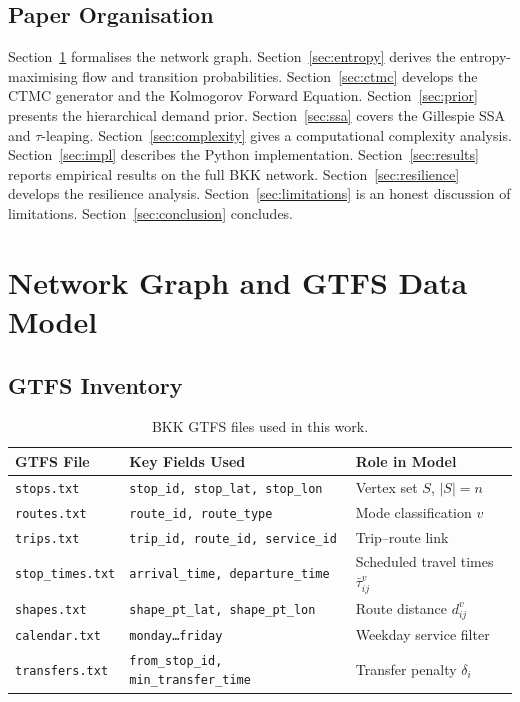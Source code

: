 \documentclass[11pt,a4paper]{article}
\theoremstyle{plain}
\theoremstyle{definition}
\theoremstyle{remark}
\begin{document}
\subsection{Paper Organisation}

Section~\ref{sec:network} formalises the network graph.
Section~\ref{sec:entropy} derives the entropy-maximising flow and transition
probabilities.
Section~\ref{sec:ctmc} develops the CTMC generator and the Kolmogorov Forward
Equation.
Section~\ref{sec:prior} presents the hierarchical demand prior.
Section~\ref{sec:ssa} covers the Gillespie SSA and $\tau$-leaping.
Section~\ref{sec:complexity} gives a computational complexity analysis.
Section~\ref{sec:impl} describes the Python implementation.
Section~\ref{sec:results} reports empirical results on the full BKK network.
Section~\ref{sec:resilience} develops the resilience analysis.
Section~\ref{sec:limitations} is an honest discussion of limitations.
Section~\ref{sec:conclusion} concludes.

\section{Network Graph and GTFS Data Model}
\label{sec:network}

\subsection{GTFS Inventory}

\begin{table}[h]
\centering
\caption{BKK GTFS files used in this work.}
\label{tab:gtfs}
\begin{tabular}{lll}
\toprule
GTFS File & Key Fields Used & Role in Model \\
\midrule
\texttt{stops.txt}       & \texttt{stop\_id, stop\_lat, stop\_lon}     & Vertex set $S$, $|S|=n$ \\
\texttt{routes.txt}      & \texttt{route\_id, route\_type}             & Mode classification $v$ \\
\texttt{trips.txt}       & \texttt{trip\_id, route\_id, service\_id}   & Trip--route link \\
\texttt{stop\_times.txt} & \texttt{arrival\_time, departure\_time}     & Scheduled travel times $\bar\tau^v_{ij}$ \\
\texttt{shapes.txt}      & \texttt{shape\_pt\_lat, shape\_pt\_lon}     & Route distance $d^v_{ij}$ \\
\texttt{calendar.txt}    & \texttt{monday\ldots friday}                & Weekday service filter \\
\texttt{transfers.txt}   & \texttt{from\_stop\_id, min\_transfer\_time}& Transfer penalty $\delta_i$ \\
\bottomrule
\end{tabular}
\end{table}
\end{document}

